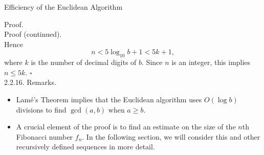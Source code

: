 \documentclass[smaller,hyperref={CJKbookmarks=true}]{beamer}
\newenvironment{PROOF}{{\noindent\!\sf\alert{Proof.}}\\}{\hfill$\square$\\}
\newcounter{zhuo}[subsection]
\begin{document}
\begin{frame}{Efficiency of the Euclidean Algorithm}
\begin{spacing}{1.05}
\begin{PROOF}
\vspace*{7pt}
\alert{Proof (continued).}\\
Hence
\[n<5\log_{10}b+1<5k+1,\]
where $k$ is the number of decimal digits of $b$. Since $n$ is an integer, this implies $n\leq 5k$.
\end{PROOF}
\vspace*{5pt}
\alert{2.2.16. Remarks.}
\begin{itemize}
  \item Lam\'{e}'s Theorem implies that the Euclidean algorithm uses $O(\log b)$ divisions to find $\gcd(a,b)$ when $a\geq b$.
  \item A crucial element of the proof is to find an estimate on the size of the $n$th Fibonacci number $f_n$. In the following section, we will consider this and other recursively defined sequences in more detail.
\end{itemize}
\end{spacing}
\end{frame}
\end{document}
